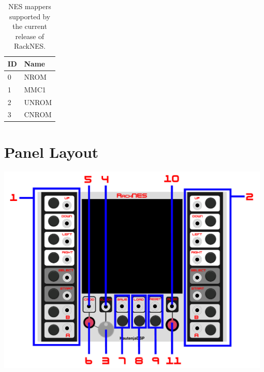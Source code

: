 \documentclass[12pt,a4paper]{article}
\begin{document}
\begin{table}[!htp]
\centering
\begin{tabular}{|l|l|}
 \hline
 ID & Name   \\
 \hline\hline
 0  & NROM   \\
 \hline
 1  & MMC1   \\
 \hline
 2  & UNROM  \\
 \hline
 3  & CNROM  \\
 \hline
\end{tabular}
\caption{NES mappers supported by the current release of RackNES.}
\label{tab:mappers}
\end{table}


\section{Panel Layout}

\includegraphics[width=\textwidth]{RackNES-Manual}
\end{document}
